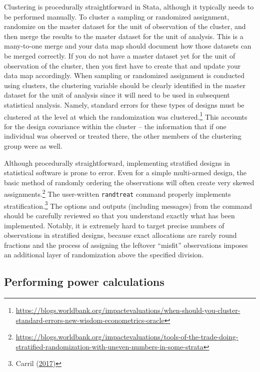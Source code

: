 \documentclass[
]{book}
\begin{document}
Clustering is procedurally straightforward in Stata,
although it typically needs to be performed manually.
To cluster a sampling or randomized assignment,
randomize on the master dataset for the unit of observation of the cluster,
and then merge the results to the master dataset for the unit of analysis.
This is a many-to-one merge and your data map should document
how those datasets can be merged correctly.
If you do not have a master dataset yet for the unit of observation of the cluster,
then you first have to create that and update your data map accordingly.
When sampling or randomized assignment is conducted using clusters,
the clustering variable should be clearly identified in the master dataset
for the unit of analysis
since it will need to be used in subsequent statistical analysis.
Namely, standard errors for these types of designs must be clustered
at the level at which the randomization was clustered.\footnote{\url{https://blogs.worldbank.org/impactevaluations/when-should-you-cluster-standard-errors-new-wisdom-econometrics-oracle}}
This accounts for the design covariance within the cluster --
the information that if one individual was observed or treated there,
the other members of the clustering group were as well.

Although procedurally straightforward,
implementing stratified designs in statistical software is prone to error.
Even for a simple multi-armed design,
the basic method of randomly ordering the observations
will often create very skewed assignments.\footnote{\url{https://blogs.worldbank.org/impactevaluations/tools-of-the-trade-doing-stratified-randomization-with-uneven-numbers-in-some-strata}}
The user-written \texttt{randtreat} command properly implements stratification.\footnote{Carril (\protect\hyperlink{ref-carril2017dealing}{2017})}
The options and outputs (including messages) from the command should be carefully reviewed
so that you understand exactly what has been implemented.
Notably, it is extremely hard to target precise numbers of observations
in stratified designs, because exact allocations are rarely round fractions
and the process of assigning the leftover ``misfit'' observations
imposes an additional layer of randomization above the specified division.

\hypertarget{performing-power-calculations}{%
\subsection*{Performing power calculations}\label{performing-power-calculations}}
\end{document}
